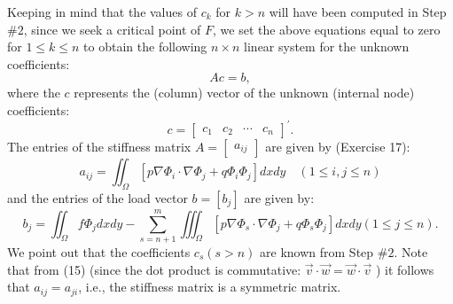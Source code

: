 \documentclass[../main.tex]{subfiles}
\begin{document}
Keeping in mind that the values of $c_{k}$ for $k>n$ will have been computed in Step $\#2$, since we seek a critical point of $F$, we set the above equations equal to zero for $1 \leq k \leq n$ to obtain the following $n \times n$ linear system for the unknown coefficients:
\begin{equation}
A c=b,
\end{equation}
where the $c$ represents the (column) vector of the unknown (internal node) coefficients:
\begin{equation}
c=\left[\begin{array}{llll}c_{1} & c_{2} & \cdots & c_{n}\end{array}\right]^{\prime}.
\end{equation}
 The entries of the stiffness matrix $A=\left[\begin{array}{l}a_{i j}\end{array}\right]$ are given by (Exercise 17):
\begin{equation}
a_{i j}=\iint_{\Omega}\left[p \nabla \Phi_{i} \cdot \nabla \Phi_{j}+q \Phi_{i} \Phi_{j}\right] d x d y \quad(1 \leq i, j \leq n)
\end{equation}
and the entries of the load vector $b=\left[b_{j}\right]$ are given by:
\begin{equation}
b_{j}=\iint_{\Omega} f \Phi_{j} d x d y-\sum_{s=n+1}^{m} \iiint_{\Omega}\left[p \nabla \Phi_{s} \cdot \nabla \Phi_{j}+q \Phi_{s} \Phi_{j}\right] d x d y(1 \leq j \leq n) .
\end{equation}
We point out that the coefficients $c_{s}(s>n)$ are known from Step $\#2$. Note that from (15) (since the dot product is commutative: $\vec{v} \cdot \vec{w}=\vec{w} \cdot \vec{v}$ ) it follows that $a_{i j}=a_{j i}$, i.e., the stiffness matrix is a symmetric matrix.
\\
\end{document}
